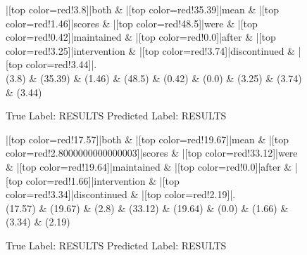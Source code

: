 \documentclass[a4paper, landscape]{article}
\begin{document}
\clearpage
\begin{figure}
\begin{center}
\begin{dependency}
\begin{deptext}
|[top color=red!3.8]|both \& |[top color=red!35.39]|mean \& |[top color=red!1.46]|scores \& |[top color=red!48.5]|were \& |[top color=red!0.42]|maintained \& |[top color=red!0.0]|after \& |[top color=red!3.25]|intervention \& |[top color=red!3.74]|discontinued \& |[top color=red!3.44]|.\\
(3.8) \& (35.39) \& (1.46) \& (48.5) \& (0.42) \& (0.0) \& (3.25) \& (3.74) \& (3.44)\\
\end{deptext}
\end{dependency}
\end{center}
\caption{True Label: RESULTS Predicted Label: RESULTS}
\end{figure}
\clearpage
\begin{figure}
\begin{center}
\begin{dependency}
\begin{deptext}
|[top color=red!17.57]|both \& |[top color=red!19.67]|mean \& |[top color=red!2.8000000000000003]|scores \& |[top color=red!33.12]|were \& |[top color=red!19.64]|maintained \& |[top color=red!0.0]|after \& |[top color=red!1.66]|intervention \& |[top color=red!3.34]|discontinued \& |[top color=red!2.19]|.\\
(17.57) \& (19.67) \& (2.8) \& (33.12) \& (19.64) \& (0.0) \& (1.66) \& (3.34) \& (2.19)\\
\end{deptext}
\end{dependency}
\end{center}
\caption{True Label: RESULTS Predicted Label: RESULTS}
\end{figure}
\clearpage
\end{document}
